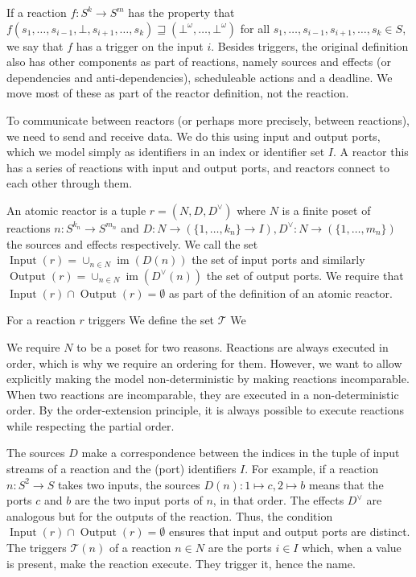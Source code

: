 If a reaction $f : S^k \rightarrow S^m$ has the property that $f(s_1,\ldots,s_{i-1},\bot,s_{i+1},\ldots,s_k) \sqsupseteq (\bot^\omega,\ldots,\bot^\omega)$ for all $s_1,\ldots,s_{i-1},s_{i+1},\ldots,s_k \in S$, we say that $f$ has a trigger on the input $i$.
Besides triggers, the original definition also has other components as part of reactions, namely sources and effects (or dependencies and anti-dependencies),  scheduleable actions and a deadline.
We move most of these as part of the reactor definition, not the reaction.

To communicate between reactors (or perhaps more precisely, between reactions), we need to send and receive data.
We do this using input and output ports, which we model simply as identifiers in an index or identifier set $I$. 
A reactor this has a series of reactions with input and output ports, and reactors connect to each other through them.

\begin{defn}[Reactor]
\label{defn:reactor}
An atomic reactor is a tuple $r = (N,D,D^\vee)$  where $N$ is a finite \ac{poset} of reactions $n : S^{k_n} \rightarrow S^{m_n}$ and $D : N \rightarrow (\{1, \ldots, k_n\} \rightarrow I), D^\vee : N \rightarrow (\{1, \ldots, m_n\})$ the sources and effects respectively.
We call the set $\operatorname{Input}(r) = \cup_{ n \in N} \operatorname{im}(D(n))$ the set of input ports and similarly $\operatorname{Output}(r) = \cup_{ n \in N} \operatorname{im}(D^\vee(n))$ the set of output ports.
We require that $\operatorname{Input}(r) \cap \operatorname{Output}(r) = \emptyset$ as part of the definition of an atomic reactor.
\end{defn}

For a reaction $r$ triggers
 We define the set $\mathcal{T}$
We 

We require $N$ to be a \ac{poset} for two reasons. Reactions are always executed in order, which is why we require an ordering for them. 
However, we want to allow explicitly making the model non-deterministic by making reactions incomparable. 
When two reactions are incomparable, they are executed in a non-deterministic order.
By the order-extension principle, it is always possible to execute reactions while respecting the partial order.

The sources $D$ make a correspondence between the indices in the tuple of input streams of a reaction and the (port) identifiers $I$.
For example, if a reaction $n : S^2 \rightarrow S$ takes two inputs, the sources $D(n) : 1 \mapsto c, 2 \mapsto b$ means that the ports $c$ and $b$ are the two input ports of $n$, in that order.
The effects $D^\vee$ are analogous but for the outputs of the reaction.
Thus, the condition $\operatorname{Input}(r) \cap \operatorname{Output}(r) = \emptyset$ ensures that input and output ports are distinct.
The triggers $\mathcal{T}(n)$ of a reaction $n \in N$ are the ports $i \in I$ which, when a value is present, make the reaction execute.
They trigger it, hence the name.

